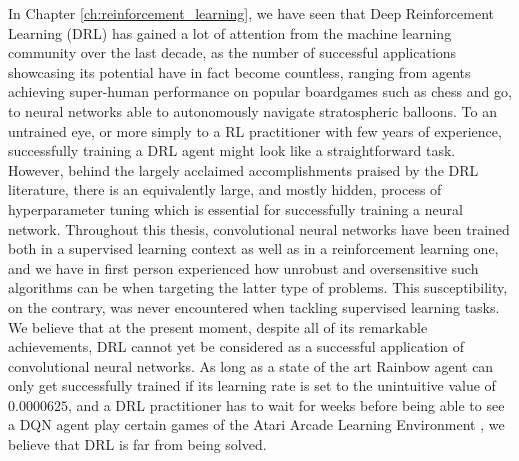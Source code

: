 In Chapter \ref{ch:reinforcement_learning}, we have seen that Deep Reinforcement Learning (DRL) has gained a lot of attention from the machine learning community over the last decade, as the number of successful applications showcasing its potential have in fact become countless, ranging from agents achieving super-human performance on popular boardgames such as chess and go, to neural networks able to autonomously navigate stratospheric balloons. To an untrained eye, or more simply to a RL practitioner with few years of experience, successfully training a DRL agent might look like a straightforward task. However, behind the largely acclaimed accomplishments praised by the DRL literature, there is an equivalently large, and mostly hidden, process of hyperparameter tuning which is essential for successfully training a neural network. Throughout this thesis, convolutional neural networks have been trained both in a supervised learning context as well as in a reinforcement learning one, and we have in first person experienced how unrobust and oversensitive such algorithms can be when targeting the latter type of problems. This susceptibility, on the contrary, was never encountered when tackling supervised learning tasks. We believe that at the present moment, despite all of its remarkable achievements, DRL cannot yet be considered as a successful application of convolutional neural networks. As long as a state of the art Rainbow agent \cite{hessel2018rainbow} can only get successfully trained if its learning rate is set to the unintuitive value of $0.0000625$, and a DRL practitioner has to wait for weeks before being able to see a DQN agent play certain games of the Atari Arcade Learning Environment \cite{kaiser2019model}, we believe that DRL is far from being solved.


